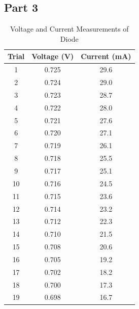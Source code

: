 \documentclass[twocolumn,english]{IEEEtran}
\theoremstyle{plain}
\theoremstyle{plain}
\begin{document}
\subsection*{\textbf{Part 3}}
  \begin{table}[H]
  \caption{Voltage and Current Measurements of Diode}
  \centering{}
  \label{tb:data_part3a}
  \begin{tabular}{|c|c|c|}
  \hline
  \textbf{Trial} & \textbf{Voltage (V)} & \textbf{Current (mA)} \\ \hline
  1              & 0.725                & 29.6                  \\ \hline
  2              & 0.724                & 29.0                  \\ \hline
  3              & 0.723                & 28.7                  \\ \hline
  4              & 0.722                & 28.0                  \\ \hline
  5              & 0.721                & 27.6                  \\ \hline
  6              & 0.720                & 27.1                  \\ \hline
  7              & 0.719                & 26.1                  \\ \hline
  8              & 0.718                & 25.5                  \\ \hline
  9              & 0.717                & 25.1                  \\ \hline
  10             & 0.716                & 24.5                  \\ \hline
  11             & 0.715                & 23.6                  \\ \hline
  12             & 0.714                & 23.2                  \\ \hline
  13             & 0.712                & 22.3                  \\ \hline
  14             & 0.710                & 21.5                  \\ \hline
  15             & 0.708                & 20.6                  \\ \hline
  16             & 0.705                & 19.2                  \\ \hline
  17             & 0.702                & 18.2                  \\ \hline
  18             & 0.700                & 17.3                  \\ \hline
  19             & 0.698                & 16.7                  \\ \hline

\end{tabular}
\end{table}
\end{document}
